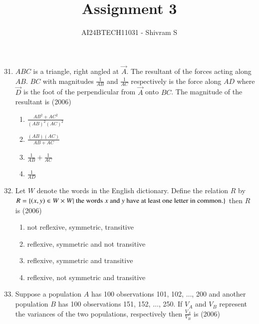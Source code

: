 \documentclass[journal]{IEEEtran}
\begin{document}

\onecolumn

\title{Assignment 3}
\author{AI24BTECH11031 - Shivram S}
\maketitle
\bigskip

\renewcommand{\thefigure}{\theenumi}
\renewcommand{\thetable}{\theenumi}

\begin{enumerate}
    \setcounter{enumi}{30}
    \item $ABC$ is a triangle, right angled at $\vec A$. The resultant of
        the forces acting along $AB$. $BC$ with magnitudes $\frac {1} {AB}$
        and $\frac {1} {AC}$ respectively is the force along $AD$ where
        $\vec D$ is the foot of the perpendicular from $\vec A$ onto $BC$.
        The magnitude of the resultant is
        \hfill (2006)

        \begin{multicols}{2}
            \begin{enumerate}
                \item $\frac {AB^2 + AC^2} {(AB)^2(AC)^2}$
                \item $\frac {(AB)(AC)} {AB + AC}$
                \item $\frac {1} {AB} + \frac {1} {AC}$
                \item $ \frac {1} {AD}$
            \end{enumerate}
        \end{multicols}

    \item Let $W$ denote the words in the English dictionary. Define the
        relation $R$ by $R = \left\{\left(x, y\right) \in W \times W \vert
        \text{ the words $x$ and $y$ have at least one letter in common.}\right\}$
        then $R$ is
        \hfill (2006)

        \begin{enumerate}
            \item not reflexive, symmetric, transitive
            \item reflexive, symmetric and not transitive
            \item reflexive, symmetric and transitive
            \item reflexive, not symmetric and transitive
        \end{enumerate}

    \item Suppose a population $A$ has 100 observations 101, 102, $\dots$, 200
        and another population $B$ has 100 observations 151, 152, $\dots$, 250.
        If $V_A$ and $V_B$ represent the variances of the two populations,
        respectively then $\frac {V_A} {V_B}$ is
        \hfill (2006)


\end{enumerate}
\end{document}
